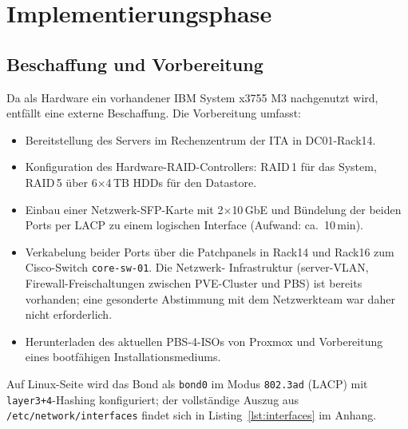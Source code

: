 \section{Implementierungsphase}
\label{sec:Implementierungsphase}

\subsection{Beschaffung und Vorbereitung}
\label{sec:Beschaffung}
Da als Hardware ein vorhandener IBM System x3755 M3 nachgenutzt wird,
entfällt eine externe Beschaffung. Die Vorbereitung umfasst:
\begin{itemize}
    \item Bereitstellung des Servers im Rechenzentrum der \ac{ITA}
          in DC01-Rack14.
    \item Konfiguration des Hardware-\ac{RAID}-Controllers:
          \ac{RAID}\,1 für das System, \ac{RAID}\,5 über 6$\times$4\,TB
          HDDs für den Datastore.
    \item Einbau einer Netzwerk-\ac{SFP}-Karte mit 2$\times$10\,GbE
          und Bündelung der beiden Ports per \ac{LACP} zu einem
          logischen Interface (Aufwand: ca.~10\,min).
    \item Verkabelung beider Ports über die Patchpanels in Rack14
          und Rack16 zum Cisco-Switch
          \texttt{core-sw-01}. Die Netzwerk-
          Infrastruktur (server-\ac{VLAN}, Firewall-Freischaltungen
          zwischen \ac{PVE}-Cluster und \ac{PBS}) ist bereits
          vorhanden; eine gesonderte Abstimmung mit dem
          Netzwerkteam war daher nicht erforderlich.
    \item Herunterladen des aktuellen \ac{PBS}-4-ISOs von Proxmox und
          Vorbereitung eines bootfähigen Installationsmediums.
\end{itemize}

Auf Linux-Seite wird das Bond als \texttt{bond0} im Modus
\texttt{802.3ad} (\ac{LACP}) mit \texttt{layer3+4}-Hashing
konfiguriert; der vollständige Auszug aus
\texttt{/etc/network/interfaces} findet sich in
Listing~\ref{lst:interfaces} im Anhang.


